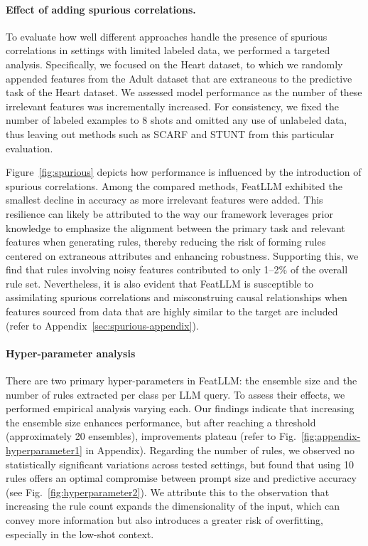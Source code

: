 \vspace*{-0.12in}
\paragraph{Effect of adding spurious correlations.} To evaluate how well different approaches handle the presence of spurious correlations in settings with limited labeled data, we performed a targeted analysis. Specifically, we focused on the Heart dataset, to which we randomly appended features from the Adult dataset that are extraneous to the predictive task of the Heart dataset. We assessed model performance as the number of these irrelevant features was incrementally increased. For consistency, we fixed the number of labeled examples to 8 shots and omitted any use of unlabeled data, thus leaving out methods such as SCARF and STUNT from this particular evaluation.

Figure~\ref{fig:spurious} depicts how performance is influenced by the introduction of spurious correlations. Among the compared methods, \textsf{FeatLLM} exhibited the smallest decline in accuracy as more irrelevant features were added. This resilience can likely be attributed to the way our framework leverages prior knowledge to emphasize the alignment between the primary task and relevant features when generating rules, thereby reducing the risk of forming rules centered on extraneous attributes and enhancing robustness. Supporting this, we find that rules involving noisy features contributed to only 1–2\% of the overall rule set. Nevertheless, it is also evident that \textsf{FeatLLM} is susceptible to assimilating spurious correlations and misconstruing causal relationships when features sourced from data that are highly similar to the target are included (refer to Appendix~\ref{sec:spurious-appendix}).

\vspace*{-0.12in}
\paragraph{Hyper-parameter analysis}
There are two primary hyper-parameters in \textsf{FeatLLM}: the ensemble size and the number of rules extracted per class per LLM query. To assess their effects, we performed empirical analysis varying each. Our findings indicate that increasing the ensemble size enhances performance, but after reaching a threshold (approximately 20 ensembles), improvements plateau (refer to Fig.~\ref{fig:appendix-hyperparameter1} in Appendix). Regarding the number of rules, we observed no statistically significant variations across tested settings, but found that using 10 rules offers an optimal compromise between prompt size and predictive accuracy (see Fig.~\ref{fig:hyperparameter2}). We attribute this to the observation that increasing the rule count expands the dimensionality of the input, which can convey more information but also introduces a greater risk of overfitting, especially in the low-shot context.

